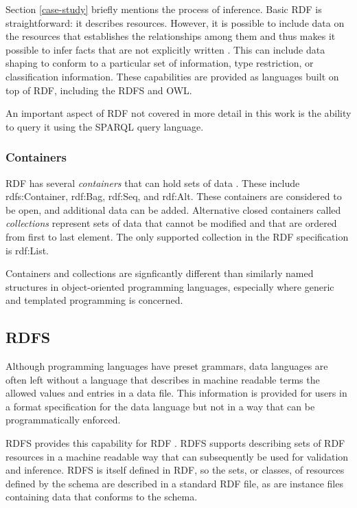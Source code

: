 Section \ref{case-study} briefly mentions the process of inference. Basic RDF
is straightforward: it describes resources. However, it is possible to include data
on the resources that establishes the relationships among them and thus makes
it possible to infer facts that are not explicitly written
\cite{allemang_semantic_2008}. This can include data shaping to conform to a
particular set of information, type restriction, or classification information.
These capabilities are provided as languages built on top of RDF, including the
RDFS and OWL.

An important aspect of RDF not covered in more detail in this work is the
ability to query it using the SPARQL query language. 


\subsubsection{Containers}

RDF has several \textit{containers} that can hold sets of data
\cite{rdf-syntax}. These include rdfs:Container, rdf:Bag, rdf:Seq, and rdf:Alt.
These containers are considered to be open, and additional data can be added.
Alternative closed containers called \textit{collections} represent sets of data
that cannot be modified and that are ordered from first to last element. The
only supported collection in the RDF specification is rdf:List.

Containers and collections are signficantly different than similarly named
structures in object-oriented programming languages, especially where generic
and templated programming is concerned.

\subsection{RDFS}

Although programming languages have preset grammars, data languages are often
left without a language that describes in machine readable terms the allowed
values and entries in a data file. This information is provided for users in
a format specification for the data language but not in a way that can be
programmatically enforced. 

RDFS provides this capability for RDF \cite{rdf-schema,
allemang_semantic_2008}. RDFS supports describing sets of RDF resources in a
machine readable way that can subsequently be used for validation and inference.
RDFS is itself defined in RDF, so the sets, or classes, of resources defined by
the schema are described in a standard RDF file, as are instance files
containing data that conforms to the schema.

